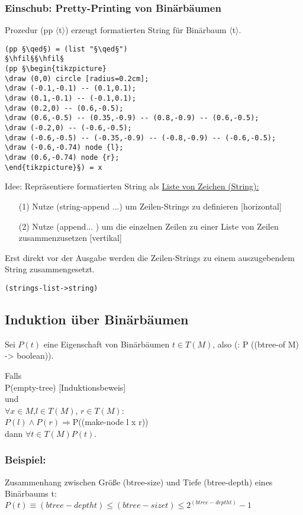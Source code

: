 \documentclass[a4paper,12pt]{article}
\newcommand{\la}{$\langle$}
\newcommand{\ra}{$\rangle$}
\begin{document}
\subsubsection{Einschub: Pretty-Printing von Binärbäumen}
Prozedur (pp \la t\ra) erzeugt formatierten String für Binärbaum \la t\ra.
\begin{lstlisting}[style=customc]
(pp §\qed§) = (list "§\qed§")                                          §\hfil§§\hfil§
(pp §\begin{tikzpicture}
\draw (0,0) circle [radius=0.2cm];
\draw (-0.1,-0.1) -- (0.1,0.1);
\draw (0.1,-0.1) -- (-0.1,0.1);
\draw (0.2,0) -- (0.6,-0.5);
\draw (0.6,-0.5) -- (0.35,-0.9) -- (0.8,-0.9) -- (0.6,-0.5);
\draw (-0.2,0) -- (-0.6,-0.5);
\draw (-0.6,-0.5) -- (-0.35,-0.9) -- (-0.8,-0.9) -- (-0.6,-0.5);
\draw (-0.6,-0.74) node {l};
\draw (0.6,-0.74) node {r};
\end{tikzpicture}§) = x
\end{lstlisting}

Idee: Repräsentiere formatierten String als \uline{Liste von Zeichen (String):}
\begin{itemize}
\item[(1)] Nutze (string-append ...) um Zeilen-Strings zu definieren [horizontal]
\item[(2)] Nutze (append... ) um die einzelnen Zeilen zu einer Liste von Zeilen zusammenzusetzen [vertikal]
\end{itemize}
Erst direkt vor der Ausgabe werden die Zeilen-Strings zu einem auszugebendem String zusammengesetzt.
\begin{lstlisting}[style=customc]
(strings-list->string)
\end{lstlisting}
\subsection{Induktion über Binärbäumen}
Sei $P(t)$ eine Eigenschaft von Binärbäumen $t\in T(M)$, also (: P ((btree-of M) -> boolean)).

Falls\\
     P(empty-tree) [Induktionsbeweis]\\
und \\
    $\forall x \in M$,$l\in T(M)$, $r \in T(M)$:\\
    $P(l)\land P(r) \Rightarrow $P((make-node l x r))\\
dann $\forall t \in T(M) P(t).$

\subsubsection{Beispiel:}
Zusammenhang zwischen Größe (btree-size) und Tiefe (btree-depth) eines Binärbaums t:\\
$P(t)\equiv (btree-depth t) \leq (btree-size t) \leq 2^{(btree-depth t)}-1$
\end{document}
